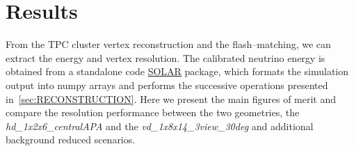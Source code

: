 \section{Results\label{sec:RESULTS}}
From the TPC cluster vertex reconstruction and the flash--matching, we can extract the energy and vertex resolution. The calibrated neutrino energy is obtained from a standalone code \href{https://github.com/CIEMAT-Neutrino/SOLAR}{SOLAR} package, which formats the simulation output into numpy arrays and performs the successive operations presented in~\cref{sec:RECONSTRUCTION}. Here we present the main figures of merit and compare the resolution performance between the two geometries, the \textit{hd\_1x2x6\_centralAPA} and the \textit{vd\_1x8x14\_3view\_30deg} and additional background reduced scenarios.





